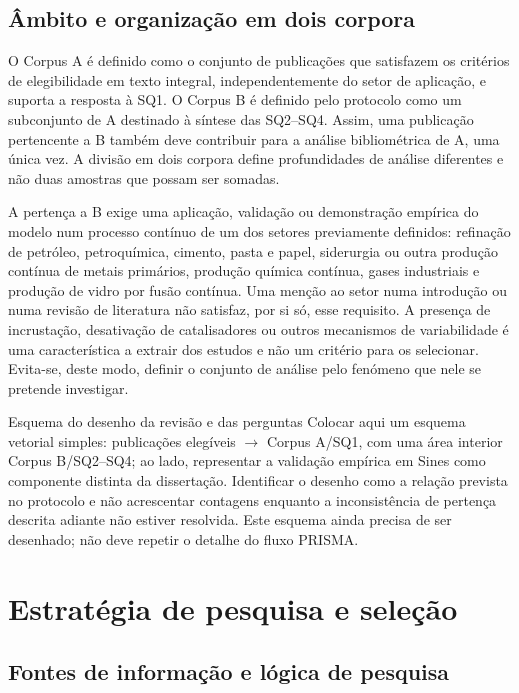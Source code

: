 \subsection{Âmbito e organização em dois corpora}

O Corpus A é definido como o conjunto de publicações que satisfazem os
critérios de elegibilidade em texto integral, independentemente do setor
de aplicação, e suporta a resposta à SQ1. O Corpus B é definido pelo
protocolo como um subconjunto de A destinado à síntese das SQ2--SQ4.
Assim, uma publicação pertencente a B também deve contribuir para a
análise bibliométrica de A, uma única vez. A divisão em dois corpora
define profundidades de análise diferentes e não duas amostras que
possam ser somadas.

A pertença a B exige uma aplicação, validação ou demonstração empírica
do modelo num processo contínuo de um dos setores previamente definidos:
refinação de petróleo, petroquímica, cimento, pasta e papel, siderurgia
ou outra produção contínua de metais primários, produção química contínua,
gases industriais e produção de vidro por fusão contínua. Uma menção
ao setor numa introdução ou numa revisão de literatura não satisfaz,
por si só, esse requisito. A presença de incrustação, desativação de
catalisadores ou outros mecanismos de variabilidade é uma característica
a extrair dos estudos e não um critério para os selecionar. Evita-se,
deste modo, definir o conjunto de análise pelo fenómeno que nele se
pretende investigar.

{Esquema do desenho da revisão e das perguntas}
{Colocar aqui um esquema vetorial simples: publicações elegíveis
$\rightarrow$ Corpus A/SQ1, com uma área interior Corpus B/SQ2--SQ4;
ao lado, representar a validação empírica em Sines como componente
distinta da dissertação. Identificar o desenho como a relação prevista
no protocolo e não acrescentar contagens enquanto a inconsistência de
pertença descrita adiante não estiver resolvida. Este esquema ainda
precisa de ser desenhado; não deve repetir o detalhe do fluxo PRISMA.}%


\section{Estratégia de pesquisa e seleção}
\label{sec:pesquisa}

\subsection{Fontes de informação e lógica de pesquisa}

